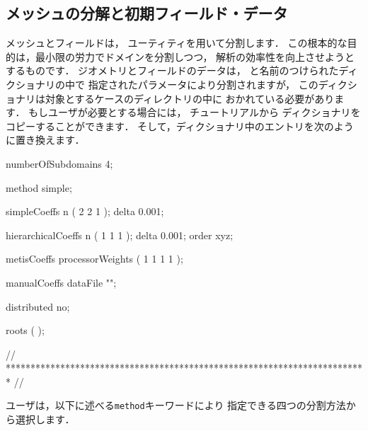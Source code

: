 \subsection{メッシュの分解と初期フィールド・データ}
\label{ssec:3.4.1}
%
%
%
%
メッシュとフィールドは，
%
%
ユーティティを用いて分割します．
この根本的な目的は，最小限の労力でドメインを分割しつつ，
解析の効率性を向上させようとするものです．
ジオメトリとフィールドのデータは，
%
%
と名前のつけられたディクショナリの中で
指定されたパラメータにより分割されますが，
このディクショナリは対象とするケースのディレクトリの中に
おかれている必要があります．
もしユーザが必要とする場合には，
チュートリアルから
ディクショナリをコピーすることができます．
そして，ディクショナリ中のエントリを次のように置き換えます．
\begin{OFverbatim}[file, linenum=17]

numberOfSubdomains 4;

method          simple;

simpleCoeffs
{
    n               ( 2 2 1 );
    delta           0.001;
}

hierarchicalCoeffs
{
    n               ( 1 1 1 );
    delta           0.001;
    order           xyz;
}

metisCoeffs
{
    processorWeights ( 1 1 1 1 );
}

manualCoeffs
{
    dataFile        "";
}

distributed     no;

roots           ( );


// ************************************************************************* //
\end{OFverbatim}
ユーザは，以下に述べる\verb|method|キーワードにより
指定できる四つの分割方法から選択します．
